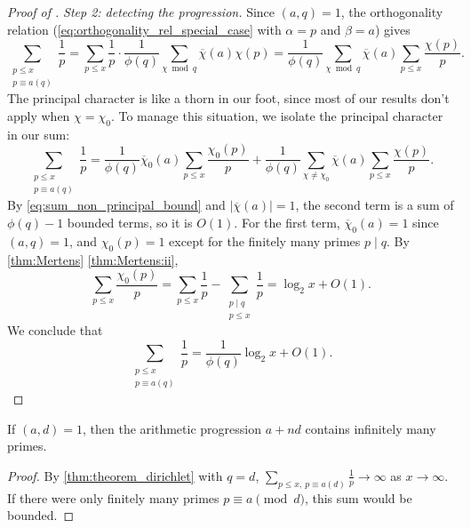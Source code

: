 \begin{proof}[Proof of ]
    \emph{Step 2: detecting the progression.} Since $(a,q)=  1$, the orthogonality relation (\cref{eq:orthogonality_rel_special_case} with $\alpha = p$ and $\beta = a$) gives
    \begin{equation*}
        \sum_{\substack{p \le x \\ p \equiv a (q)}} \frac{1}{p} = \sum_{p\le x}\frac1p\cdot\frac{1}{\phi(q)} \sum_{\chi \bmod q} \overline\chi(a)\chi(p) = \frac{1}{\phi(q)} \sum_{\chi \bmod q}\overline\chi(a) \sum_{p\le x}\frac{\chi(p)}{p}.
    \end{equation*}
    The principal character is like a thorn in our foot, since most of our results don't apply when $\chi = \chi_0$. To manage this situation, we isolate the principal character in our sum:
    \begin{equation*}
        \sum_{\substack{p \le x \\ p \equiv a (q)}} \frac{1}{p} = \frac{1}{\phi(q)} \overline\chi_0(a) \sum_{p\le x}\frac{\chi_0(p)}{p} + \frac{1}{\phi(q)} \sum_{\chi \neq \chi_0}\overline\chi(a) \sum_{p\le x}\frac{\chi(p)}{p}.
    \end{equation*}
    By \cref{eq:sum_non_principal_bound} and $\lvert\overline\chi(a)\rvert = 1$, the second term is a sum of $\phi(q)-1$ bounded terms, so it is $O(1)$. For the first term, $\overline\chi_0(a) = 1$ since $(a,q) = 1$, and $\chi_0(p) = 1$ except for the finitely many primes $p \mid q$. By \cref{thm:Mertens} \ref{thm:Mertens:ii},
    \begin{equation*}
        \sum_{p\le x}\frac{\chi_0(p)}{p} = \sum_{p\le x}\frac1p - \sum_{\substack{p\mid q\\ p \le x}}\frac1p = \log_2 x + O(1).
    \end{equation*}
    We conclude that
    \begin{equation*}
        \sum_{\substack{p \le x \\ p \equiv a (q)}} \frac{1}{p} =\frac{1}{\phi(q)}\log_2 x + O(1).
    \end{equation*}
\end{proof}

\begin{corollary}
    If $(a,d)=1$, then the arithmetic progression $a+nd$ contains infinitely many primes.
\end{corollary}
\begin{proof}
    By \cref{thm:theorem_dirichlet} with $q = d$, $\sum_{p\le x,\ p\equiv a (d)}\frac1p\to\infty$ as $x\to\infty$. If there were only finitely many primes $p \equiv a \pmod d$, this sum would be bounded.
\end{proof}
